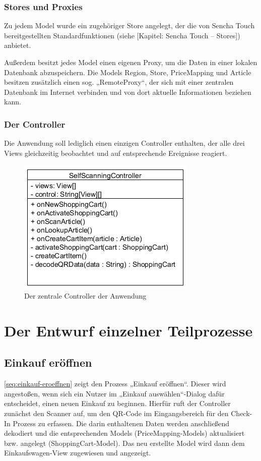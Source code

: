 \subsubsection*{Stores und Proxies}
Zu jedem Model wurde ein zugehöriger Store angelegt, der die von Sencha Touch bereitgestellten Standardfunktionen (siehe [Kapitel: Sencha Touch – Stores]) anbietet. 

Außerdem besitzt jedes Model einen eigenen Proxy, um die Daten in einer lokalen Datenbank abzuspeichern. Die Models Region, Store, PriceMapping und Article besitzen zusätzlich einen sog. „RemoteProxy“, der sich mit einer zentralen Datenbank im Internet verbinden und von dort aktuelle Informationen beziehen kann.

\subsubsection*{Der Controller}
Die Anwendung soll lediglich einen einzigen Controller enthalten, der alle drei Views gleichzeitig beobachtet und auf entsprechende Ereignisse reagiert. %

\begin{figure}[H]
\includegraphics[scale=1]{res/controller.png}
\caption{Der zentrale Controller der Anwendung}
\end{figure}

\section{Der Entwurf einzelner Teilprozesse}
\subsection{Einkauf eröffnen}
\vref*{seq:einkauf-eroeffnen} zeigt den Prozess „Einkauf eröffnen“. Dieser wird angestoßen, wenn sich ein Nutzer im „Einkauf auswählen“-Dialog dafür entscheidet, einen neuen Einkauf zu beginnen. Hierfür ruft der Controller zunächst den Scanner auf, um den QR-Code im Eingangsbereich für den Check-In Prozess zu erfassen. Die darin enthaltenen Daten werden anschließend dekodiert und die entsprechenden Models (PriceMapping-Models) aktualisiert bzw. angelegt (ShoppingCart-Model). Das neu erstellte Model wird dann dem Einkaufswagen-View zugewiesen und angezeigt.

